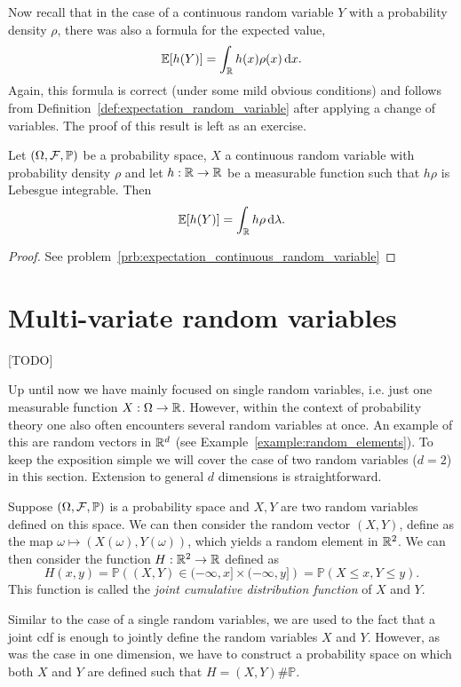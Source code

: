 Now recall that in the case of a continuous random variable $Y$ with a probability density $\rho$, there was also a formula for the expected value,
\[
	\mathbb E[h(Y)] = \int_{\mathbb R} h(x) \rho(x) \, \mathrm{d} x.
\]
Again, this formula is correct (under some mild obvious conditions) and follows from Definition~\ref{def:expectation_random_variable} after applying a change of variables. The proof of this result is left as an exercise.

\begin{lemma}\label{lem:expectation_continuous_random_variable}
Let $(\Omega, \mathcal F, \mathbb{P})$ be a probability space, $X$ a continuous random variable with probability density $\rho$ and let $h : \mathbb R \to \mathbb R$ be a measurable function such that $h \rho$ is Lebesgue integrable. Then
\[
	\mathbb E[h(Y)] = \int_{\mathbb R} h \rho \, \mathrm{d} \lambda.
\]
\end{lemma}

\begin{proof}
See problem~\ref{prb:expectation_continuous_random_variable}
\end{proof}

\section{Multi-variate random variables}\label{sec:multi_variate_rvs}

[TODO]

Up until now we have mainly focused on single random variables, i.e. just one measurable function $X : \Omega \to \mathbb R$. However, within the context of probability theory one also often encounters several random variables at once. An example of this are random vectors in $\mathbb R^d$ (see Example~\ref{example:random_elements}). To keep the exposition simple we will cover the case of two random variables ($d = 2$) in this section. Extension to general $d$ dimensions is straightforward. 

Suppose $(\Omega, \mathcal F, \mathbb{P})$ is a probability space and $X, Y$ are two random variables defined on this space. We can then consider the random vector $(X,Y)$, define as the map $\omega \mapsto (X(\omega), Y(\omega))$, which yields a random element in $\mathbb R^2$. We can then consider the function $H : \mathbb R^2 \to \mathbb R$ defined as
\[
	H(x,y) = \mathbb{P}\left((X,Y) \in (-\infty ,x] \times (-\infty, y]\right) = \mathbb{P}(X \le x, Y \le y).
\]
This function is called the \emph{joint cumulative distribution function} of $X$ and $Y$. 

Similar to the case of a single random variables, we are used to the fact that a joint cdf is enough to jointly define the random variables $X$ and $Y$. However, as was the case in one dimension, we have to construct a probability space on which both $X$ and $Y$ are defined such that $H = (X, Y)\# \mathbb{P}$. 


